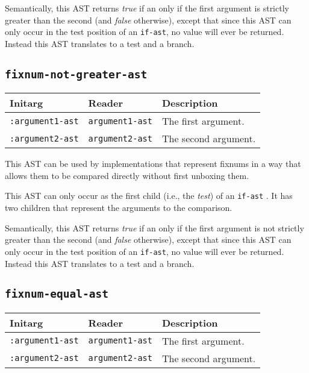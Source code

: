 Semantically, this AST returns \emph{true} if an only if the first
argument is strictly greater than the second (and \emph{false}
otherwise), except that since this AST can only occur in the test
position of an \texttt{if-ast}, no value will ever be returned.
Instead this AST translates to a test and a branch. 

\subsection{\texttt{fixnum-not-greater-ast}}
\label{fixnum-not-greater-ast}

\begin{tabular}{|l|l|l|}
\hline
Initarg & Reader & Description\\
\hline\hline
\texttt{:argument1-ast} & \texttt{argument1-ast} & The first argument.\\
\hline
\texttt{:argument2-ast} & \texttt{argument2-ast} & The second argument.\\
\hline
\end{tabular}

This AST can be used by implementations that represent fixnums in a
way that allows them to be compared directly without first unboxing
them.

This AST can only occur as the first child (i.e., the \emph{test}) of
an \texttt{if-ast} .  It has two children that
represent the arguments to the comparison.  

Semantically, this AST returns \emph{true} if an only if the first
argument is not strictly greater than the second (and \emph{false}
otherwise), except that since this AST can only occur in the test
position of an \texttt{if-ast}, no value will ever be returned.
Instead this AST translates to a test and a branch. 

\subsection{\texttt{fixnum-equal-ast}}
\label{fixnum-equal-ast}

\begin{tabular}{|l|l|l|}
\hline
Initarg & Reader & Description\\
\hline\hline
\texttt{:argument1-ast} & \texttt{argument1-ast} & The first argument.\\
\hline
\texttt{:argument2-ast} & \texttt{argument2-ast} & The second argument.\\
\hline
\end{tabular}

